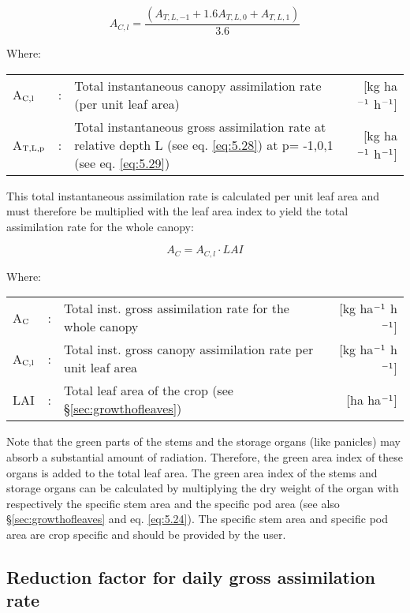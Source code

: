 \begin{equation}
A_{C,l} = {\frac{(A_{T,L,-1} + 1.6 A_{T,L,0} + A_{T,L,1})}{3.6}}
\end{equation}

Where:\\[5pt]
\begin{tabularx}{\textwidth}{llXr}
	A$_{{\rm C,l}}$ &:& Total instantaneous canopy assimilation 
	rate (per unit leaf area)    &    [kg ha$^{{\rm -1}}$ h$^{{\rm -1}}$]\\
	A$_{{\rm T,L,p}}$ &:& Total instantaneous gross assimilation rate at relative 
	depth L (see eq. \ref{eq:5.28}) at p= -1,0,1 (see eq. \ref{eq:5.29})    &    
	[kg ha$^{{\rm -1}}$ h$^{{\rm -1}}$]\\
\end{tabularx}

This total instantaneous assimilation rate is calculated per unit leaf area and must
therefore be multiplied with the leaf area index to yield the total assimilation rate for the
whole canopy:

\begin{equation}
\label{eq:5.31}
A_{C} = A_{C,l} \cdot LAI
\end{equation}

Where:\\[5pt]
\begin{tabularx}{\textwidth}{llXr}
	A$_{{\rm C}}$ &:& Total inst. gross assimilation rate for
	the whole canopy  &  [kg ha$^{{\rm -1}}$ h$^{{\rm -1}}$]\\
	A$_{{\rm C,l}}$ &:& Total inst. gross canopy assimilation rate 
	per unit leaf area &  [kg ha$^{{\rm -1}}$ h$^{{\rm -1}}$]\\
	LAI &:& Total leaf area of the crop (see \S \ref{sec:growthofleaves})  & [ha ha$^{{\rm -1}}$]\\
\end{tabularx}

Note that the green parts of the stems and the storage organs (like panicles) may absorb a
substantial amount of radiation. Therefore, the green area index of these organs is added
to the total leaf area. The green area index of the stems and storage organs can be
calculated by multiplying the dry weight of the organ with respectively the specific stem
area and the specific pod area (see also \S \ref{sec:growthofleaves} and eq. \ref{eq:5.24}). The specific 
stem area and specific pod area are crop specific and should be provided by the user.


\subsection{Reduction factor for daily gross assimilation rate}
\label{sec:DailyGrossPhotosynthesis}

